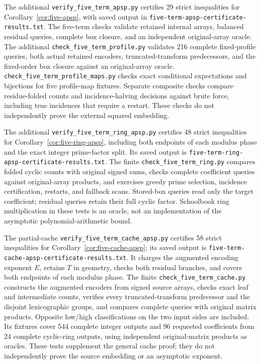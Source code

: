 \documentclass[11pt]{article}
\begin{document}
The additional \texttt{verify\_five\_term\_apsp.py} certifies 29 strict
inequalities for Corollary~\ref{cor:five-apsp}, with saved output in
\texttt{five-term-apsp-certificate-results.txt}. The five-term checks
validate retained internal arrays, balanced residual queries, complete box
closure, and an independent original-array oracle. The additional
\texttt{check\_five\_term\_profile.py} validates 216 complete fixed-profile
queries, both actual retained encoders, truncated-transform predecessors,
and the fixed-order box closure against an original-array oracle.
\texttt{check\_five\_term\_profile\_maps.py} checks exact conditional
expectations and bijections for five profile-map fixtures. Separate composite
checks compare residue-folded counts and incidence-halving decisions
against brute force, including true incidences that require a restart.
These checks do not independently prove the external squared embedding.

The additional \texttt{verify\_five\_term\_ring\_apsp.py} certifies 48
strict inequalities for Corollary~\ref{cor:five-ring-apsp}, including both
endpoints of each modulus phase and the exact integer prime-factor split.
Its saved output is \texttt{five-term-ring-apsp-certificate-results.txt}.
The finite \texttt{check\_five\_term\_ring.py} compares folded cyclic
counts with original signed sums, checks complete coefficient queries
against original-array products, and exercises greedy prime selection,
incidence certification, restarts, and fallback scans. Stored-box queries
read only the target coefficient; residual queries retain their full
cyclic factor. Schoolbook ring multiplication in these tests is an oracle,
not an implementation of the asymptotic polynomial-arithmetic bound.

The partial-cache \texttt{verify\_five\_term\_cache\_apsp.py} certifies 58
strict inequalities for Corollary~\ref{cor:five-cache-apsp}; its saved
output is \texttt{five-term-cache-apsp-certificate-results.txt}. It charges
the augmented encoding exponent $E$, retains $T$ in geometry, checks
both residual branches, and covers both endpoints of each modulus phase.
The finite \texttt{check\_five\_term\_cache.py} constructs the augmented
encoders from signed source arrays, checks exact leaf and intermediate
counts, verifies every truncated-transform predecessor and the disjoint
lexicographic groups, and compares complete queries with original matrix
products. Opposite low/high classifications on the two input sides are
included. Its fixtures cover 544 complete integer outputs and 96 requested
coefficients from 24 complete cyclic-ring outputs, using independent
original-matrix products as oracles. These tests supplement the general cache proof; they do not
independently prove the source embedding or an asymptotic exponent.
\end{document}
